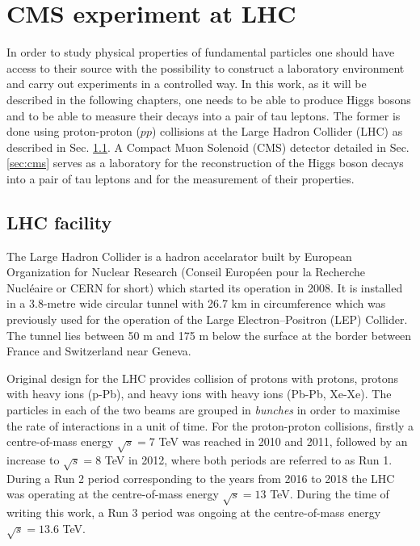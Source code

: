 \chapter{CMS experiment at LHC}\label{sec:cms-exp}

In order to study physical properties of fundamental particles one should have access to their source with the possibility to construct a laboratory environment and carry out experiments in a controlled way. In this work, as it will be described in the following chapters, one needs to be able to produce Higgs bosons and to be able to measure their decays into a pair of tau leptons. The former is done using proton-proton ($pp$) collisions at the Large Hadron Collider (LHC) as described in Sec. \ref{sec:lhc}. A Compact Muon Solenoid (CMS) detector detailed in Sec. \ref{sec:cms} serves as a laboratory for the reconstruction of the Higgs boson decays into a pair of tau leptons and for the measurement of their properties.

\section{LHC facility}\label{sec:lhc}

The Large Hadron Collider \cite{Evans:2008zzb} is a hadron accelarator built by European Organization for Nuclear Research (Conseil Européen pour la Recherche Nucléaire or CERN for short) which started its operation in 2008. It is installed in a 3.8-metre wide circular tunnel with 26.7 km in circumference which was previously used for the operation of the Large Electron–Positron (LEP) Collider. The tunnel lies between 50 m and 175 m below the surface at the border between France and Switzerland near Geneva.

Original design for the LHC provides collision of protons with protons, protons with heavy ions (p-Pb), and heavy ions with heavy ions (Pb-Pb, Xe-Xe). The particles in each of the two beams are grouped in \textit{bunches} in order to maximise the rate of interactions in a unit of time. For the proton-proton collisions, firstly a centre-of-mass energy $\sqrt{s} = 7$ TeV was reached in 2010 and 2011, followed by an increase to $\sqrt{s} = 8$ TeV in 2012, where both periods are referred to as Run 1. During a Run 2 period corresponding to the years from 2016 to 2018 the LHC was operating at the centre-of-mass energy $\sqrt{s} = 13$ TeV. During the time of writing this work, a Run 3 period was ongoing at the centre-of-mass energy $\sqrt{s} = 13.6$ TeV. 

